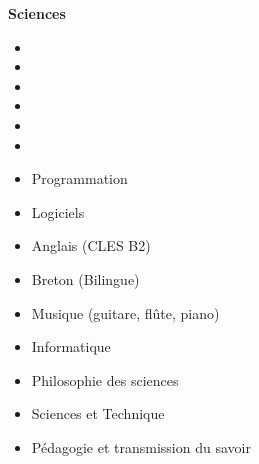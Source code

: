 


\large\textbf{Sciences}

\begin{itemize}
	\item {}
	\item {}
	\item {}
	\item {}
	\item {}
	\item {}
\end{itemize}

\divider


\begin{itemize}
\item Programmation

\smallskip
{}	

\medskip

\item Logiciels

\smallskip
{}
\end{itemize}

\divider


\begin{itemize}

\item Anglais (CLES B2)
\item Breton (Bilingue)

\end{itemize}

\medskip



\begin{itemize}
	\item Musique (guitare, flûte, piano)
	\item Informatique
	\item Philosophie des sciences
	\item Sciences et Technique
	\item Pédagogie et transmission du savoir
\end{itemize}

\medskip







%
%
%




